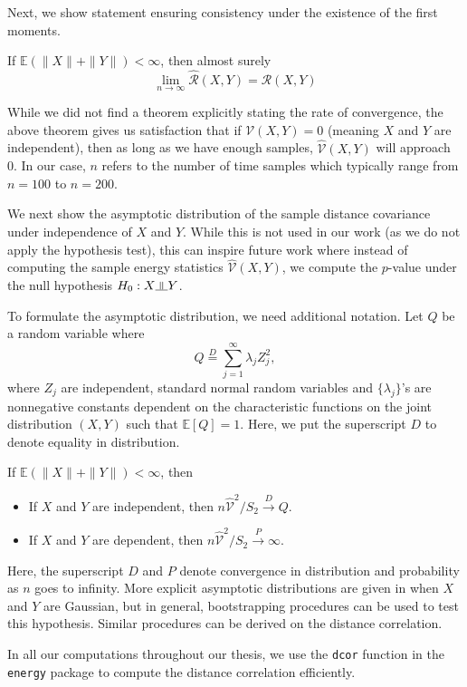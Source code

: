 Next, we show statement ensuring consistency under the existence of the
first moments.

\begin{prop}
If $\mathbb{E}(\|X\| +\|Y\|)< \infty$, then almost surely
\[
\lim_{n\rightarrow\infty}\widehat{\mathcal{R}}(X,Y) = \mathcal{R}(X,Y)
\]
\end{prop}

While we did not find a theorem explicitly stating the rate of 
convergence, the above theorem gives us satisfaction that if
$\mathcal{V}(X,Y)=0$ (meaning $X$ and $Y$ are independent), then as long 
as we have enough samples, $\widehat{\mathcal{V}}(X,Y) $ will approach
0. In our case, $n$ refers to the number of time samples which
typically range from $n=100$ to $n=200$.

We next show the asymptotic distribution of the sample distance
covariance under independence of $X$ and $Y$. While this is not used in
our work (as we do not apply the hypothesis test), this can inspire
future work where instead of computing the sample energy statistics
$\widehat{\mathcal{V}}(X,Y)$, we compute the $p$-value
under the null hypothesis $H_0: X \indep Y$.

To formulate the asymptotic distribution, we need additional notation.
Let $Q$ be a random variable where
\[ Q \overset{D}{=} \sum_{j=1}^{\infty}\lambda_j Z^2_j, \]
where $Z_j$ are independent, standard normal random variables and
$\{\lambda_j\}$'s are nonnegative constants dependent on the
characteristic functions on the joint distribution $(X,Y)$ such that
$\mathbb{E}[Q] = 1$. Here, we put the superscript $D$ to denote equality 
in distribution.

\begin{prop}
If $\mathbb{E}(\|X\| +\|Y\|)< \infty$, then
\begin{itemize}
\item If $X$ and $Y$ are independent, then $n\widehat{\mathcal{V}}^2/S_2 \overset{D}{\rightarrow} Q$.
\item If $X$ and $Y$ are dependent, then $n\widehat{\mathcal{V}}^2/S_2 \overset{P}{\rightarrow} \infty$.
\end{itemize}
\end{prop}

Here, the superscript $D$ and $P$ denote convergence in distribution and
probability as $n$ goes to infinity. More explicit asymptotic
distributions are given in \cite{szekely2013energy} when $X$ and $Y$ are
Gaussian, but in general, bootstrapping procedures can be used to test
this hypothesis. Similar procedures can be derived on the distance
correlation.

In all our computations throughout our thesis, we use the \texttt{dcor}
function in the \texttt{energy} package to compute the distance
correlation efficiently.
